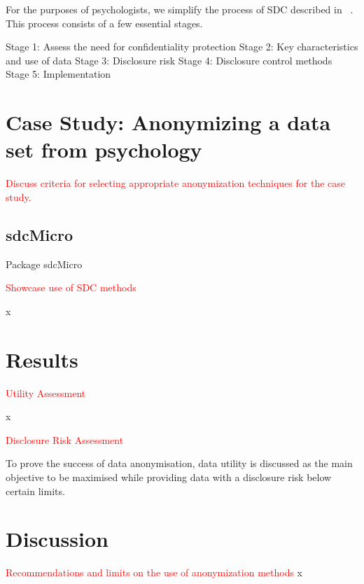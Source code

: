 \documentclass{article}
\begin{document}
For the purposes of psychologists, we simplify the process of SDC described in ~\cite{2012_Hundepool}.
This process consists of a few essential stages.

Stage 1: Assess the need for confidentiality protection
Stage 2: Key characteristics and use of data
Stage 3: Disclosure risk
Stage 4: Disclosure control methods
Stage 5: Implementation

\section{Case Study: Anonymizing a data set from psychology}

\textcolor{red}{Discuss criteria for selecting appropriate anonymization techniques for the case study.}

\subsection{sdcMicro}
Package sdcMicro~\cite{2024_Sdcmicro}

\textcolor{red}{Showcase use of SDC methods}

x

\section{Results}

\textcolor{red}{Utility Assessment}

x

\textcolor{red}{Disclosure Risk Assessment}

To prove the success of data anonymisation, data utility is discussed as the main objective to be maximised while providing data with a disclosure risk below certain limits.

\section{Discussion}

\textcolor{red}{Recommendations and limits on the use of anonymization methods}
x
\end{document}
